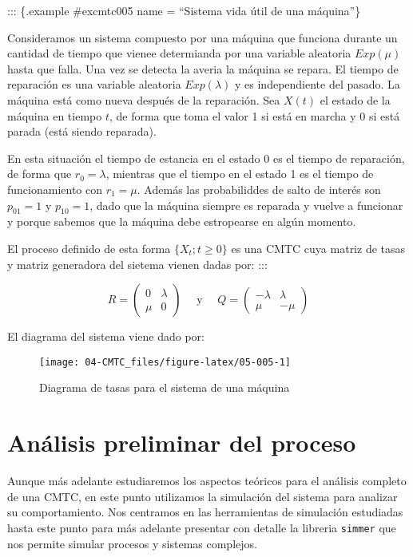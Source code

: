 \documentclass[
]{book}
\theoremstyle{definition}
\theoremstyle{definition}
\theoremstyle{definition}
\theoremstyle{definition}
\theoremstyle{remark}
\begin{document}
::: \{.example \#excmtc005 name = ``Sistema vida útil de una máquina''\}

Consideramos un sistema compuesto por una máquina que funciona durante un cantidad de tiempo que vienee determianda por una variable aleatoria \(Exp(\mu)\) hasta que falla. Una vez se detecta la averia la máquina se repara. El tiempo de reparación es una variable aleatoria \(Exp(\lambda)\) y es independiente del pasado. La máquina está como nueva después de la reparación. Sea \(X(t)\) el estado de la máquina en tiempo \(t\), de forma que toma el valor 1 si está en marcha y 0 si está parada (está siendo reparada).

En esta situación el tiempo de estancia en el estado 0 es el tiempo de reparación, de forma que \(r_0 = \lambda\), mientras que el tiempo en el estado 1 es el tiempo de funcionamiento con \(r_1 = \mu\). Además las probabiliddes de salto de interés son \(p_{01} = 1\) y \(p_{10} = 1\), dado que la máquina siempre es reparada y vuelve a funcionar y porque sabemos que la máquina debe estropearse en algún momento.

El proceso definido de esta forma \(\{X_t; t \geq 0\}\) es una CMTC cuya matriz de tasas y matriz generadora del sietema vienen dadas por: :::

\[R = 
\begin{pmatrix}
0 & \lambda \\
\mu & 0
\end{pmatrix} \quad \text{ y } \quad Q = 
\begin{pmatrix}
-\lambda & \lambda \\
\mu & -\mu
\end{pmatrix}\]

El diagrama del sistema viene dado por:

\begin{figure}

{\centering \texttt{[image: 04-CMTC\_files/figure-latex/05-005-1]} 

}

\caption{Diagrama de tasas para el sistema de una máquina}\label{fig:05-005}
\end{figure}

\hypertarget{CMTCC}{%
\section{Análisis preliminar del proceso}\label{CMTCC}}

Aunque más adelante estudiaremos los aspectos teóricos para el análisis completo de una CMTC, en este punto utilizamos la simulación del sistema para analizar su comportamiento. Nos centramos en las herramientas de simulación estudiadas hasta este punto para más adelante presentar con detalle la libreria \texttt{simmer} que nos permite simular procesos y sistemas complejos.
\end{document}
